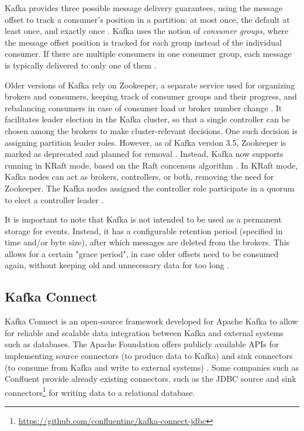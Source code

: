 Kafka provides three possible message delivery guarantees, using the message offset to track a consumer's position in a partition: at most once, the default at least once, and exactly once \cite{kafkadocumentation}. Kafka uses the notion of \textit{consumer groups}, where the message offset position is tracked for each group instead of the individual consumer. If there are multiple consumers in one consumer group, each message is typically delivered to only one of them \cite{kreps2011kafka}.

Older versions of Kafka rely on Zookeeper, a separate service used for organizing brokers and consumers, keeping track of consumer groups and their progress, and rebalancing consumers in case of consumer load or broker number change \cite{kreps2011kafka}. It facilitates leader election in the Kafka cluster, so that a single controller can be chosen among the brokers to make cluster-relevant decisions. One such decision is assigning partition leader roles. However, as of Kafka version 3.5, Zookeeper is marked as deprecated and planned for removal \cite{kafkadocumentation}. Instead, Kafka now supports running in KRaft mode, based on the Raft concensus algorithm \cite{ongaroraft2014search}. In KRaft mode, Kafka nodes can act as brokers, controllers, or both, removing the need for Zookeeper. The Kafka nodes assigned the controller role participate in a quorum to elect a controller leader \cite{kafkadocumentation}.

It is important to note that Kafka is not intended to be used as a permanent storage for events. Instead, it has a configurable retention period (specified in time and/or byte size), after which messages are deleted from the brokers. This allows for a certain "grace period", in case older offsets need to be consumed again, without keeping old and unnecessary data for too long \cite{kreps2011kafka}.

\subsection{Kafka Connect}
\label{ch02:fundamentals:apachekafkaandkafkaconnect:kafkaconnect}
Kafka Connect is an open-source framework developed for Apache Kafka to allow for reliable and scalable data integration between Kafka and external systems such as databases. The Apache Foundation offers publicly available \ac{APIs} for implementing source connectors (to produce data to Kafka) and sink connectors (to consume from Kafka and write to external systems) \cite{kafkadocumentation}. Some companies such as Confluent provide already existing connectors, such as the \ac{JDBC} source and sink connectors\footnote{\url{https://github.com/confluentinc/kafka-connect-jdbc}} for writing data to a relational database.

